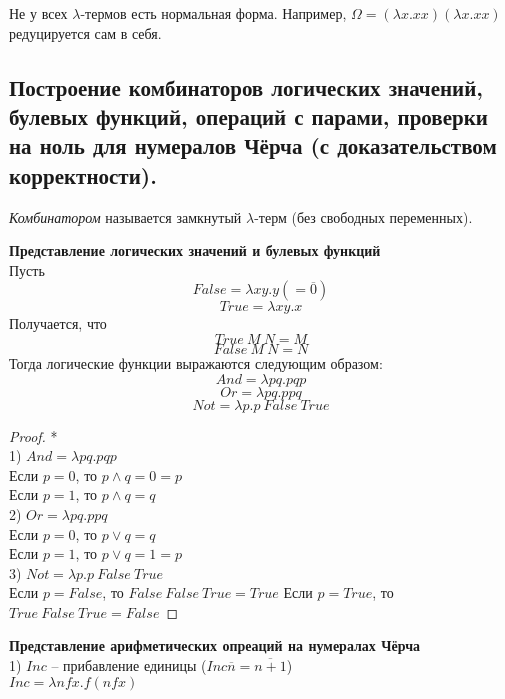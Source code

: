 \begin{note}
    Не у всех $\lambda$-термов есть нормальная форма. Например, $\Omega = (\lambda x.xx)(\lambda x.xx)$ редуцируется сам в себя.
\end{note}

\subsection{Построение комбинаторов логических значений, булевых функций, операций с парами, проверки на ноль для нумералов Чёрча (с доказательством корректности).}
    
\begin{definition}
    \textit{Комбинатором} называется замкнутый $\lambda$-терм (без свободных переменных).
\end{definition}

\textbf{Представление логических значений и булевых функций}\\

Пусть
$$
    False = \lambda xy.y (= \overline{0})
$$
$$
    True = \lambda xy.x
$$
Получается, что
$$
    True \: M \: N = M
$$
$$
    False \: M \: N = N
$$
Тогда логические функции выражаются следующим образом:
$$
    And = \lambda pq.pqp
$$
$$
    Or = \lambda pq.ppq
$$
$$
    Not = \lambda p.p \: False \: True
$$

\begin{proof}*\\
    1) $And = \lambda pq.pqp$\\
    Если $p = 0$, то $p \wedge q = 0 = p$\\
    Если $p = 1$, то $p \wedge q = q$\\
    2) $Or = \lambda pq.ppq$\\
    Если $p = 0$, то $p \lor q = q$\\
    Если $p = 1$, то $p \lor q = 1 = p$\\
    3) $Not = \lambda p.p \: False \: True$\\
    Если $p = False$, то $False \: False \: True = True$
    Если $p = True$, то $True \: False \: True = False$
\end{proof}


\textbf{Представление арифметических опреаций на нумералах Чёрча}\\

1) $Inc$ -- прибавление единицы ($Inc \overline{n} = \overline{n + 1}$)\\

$Inc = \lambda nfx.f(nfx)$\\

